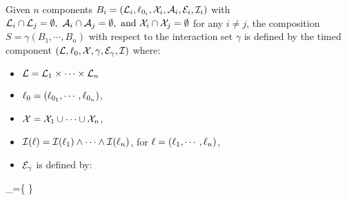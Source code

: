 \begin{definition}\label{def:comp}
  Given $n$ components $B_{i}=(\mathcal{L}_{i},\ell_{0_{i}},\mathcal{X}_{i},\mathcal{A}_{i},\mathcal{E}_{i},\mathcal{I}_{i})$ with $\mathcal{L}_i\cap\mathcal{L}_j=\emptyset, \ \mathcal{A}_i\cap
  \mathcal{A}_j=\emptyset,\text{ and }\mathcal{X}_i\cap\mathcal{X}_j=\emptyset$ for any $i\neq j$,
  the composition $S=\gamma(B_1,\cdots,B_n)$ with respect to the interaction set 
  $\gamma$ is defined by the timed component $(\mathcal{L},\ell_0,\mathcal{X},\gamma,
  \mathcal{E}_{\gamma},\mathcal{I})$ where:
  \begin{itemize}
    \item $\mathcal{L}=\mathcal{L}_1\times\cdots\times\mathcal{L}_n$
    \item $\ell_0=(\ell_{0_1},\cdots,\ell_{0_n})$,
    \item $\mathcal{X}=\mathcal{X}_1\cup\cdots\cup\mathcal{X}_n$,
    \item $\mathcal{I}(\ell)=\mathcal{I}(\ell_1)\wedge\cdots\wedge\mathcal{I}(\ell_n)$, for $\ell=
      (\ell_1,\cdots,\ell_n)$,
    \item $\mathcal{E}_{\gamma}$ is defined by:
  \end{itemize}
      \begin{myequation}
        _{\gamma}=\left\{
          \Big\lvert
         \right\} 
      \end{myequation}
      
\end{definition}

